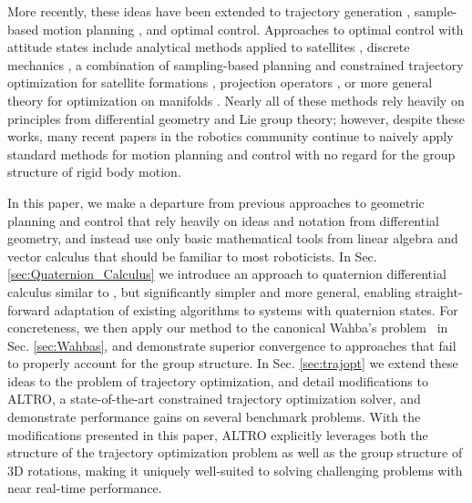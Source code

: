 \documentclass[../root.tex]{subfiles}
\begin{document}
    More recently, these ideas have been extended to trajectory generation 
    \cite{zefran_Generation_1998}, %
    sample-based motion planning \cite{zefran_Metrics_1999,kuffner_Effective_2004},
    and
    optimal control. Approaches to optimal control with attitude states include
    analytical methods applied to satellites \cite{spindler_Optimal_1998}, 
    discrete mechanics \cite{kobilarov_Discrete_2011,kobilarov_Discrete_2014,lee_Optimal_2008},
    a combination of sampling-based planning
    and constrained trajectory optimization for satellite formations 
    \cite{garcia_Trajectory_2005,aoude_Twostage_2008},
    projection operators \cite{saccon_Optimal_2013}, or more general theory for
    optimization on manifolds \cite{watterson_Trajectory_2018}. Nearly all of these
    methods rely heavily on principles from differential geometry and Lie group theory;
    however, despite these works, many recent papers in the robotics community continue
    to naively apply standard methods for motion planning and control with no regard for the
    group structure of rigid body motion.
    
    In this paper, we make a departure from previous approaches to geometric planning and
    control that rely heavily on ideas and notation from differential geometry, and
    instead use only basic mathematical tools from linear algebra and vector calculus
    that should be familiar to most roboticists. In Sec. \ref{sec:Quaternion_Calculus} we
    introduce an approach to quaternion differential calculus similar to 
    \cite{mandic_Quaternion_2011,xu_Optimization_2016}, but significantly simpler and more general, enabling
    straight-forward adaptation of existing algorithms to systems with quaternion states.
    For concreteness, we then apply our method to the canonical Wahba's
    problem~\cite{wahba_Least_1965} in Sec. \ref{sec:Wahbas}, and demonstrate superior
    convergence to approaches that fail to properly account for the group structure. In
    Sec. \ref{sec:trajopt} we extend these ideas to the problem of trajectory
    optimization, and detail modifications to ALTRO, a state-of-the-art constrained
    trajectory optimization solver, and demonstrate performance gains on several
    benchmark problems. With the modifications presented in this paper, ALTRO explicitly 
    leverages both the structure of the trajectory optimization problem as well as the 
    group structure of 3D rotations, making it uniquely well-suited to solving challenging
    problems with near real-time performance.
\end{document}
